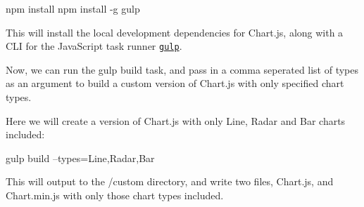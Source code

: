 \begin{DoxyCode}
npm install
npm install -g gulp
\end{DoxyCode}


This will install the local development dependencies for Chart.\+js, along with a C\+LI for the Java\+Script task runner \href{http://gulpjs.com/}{\tt gulp}.

Now, we can run the {\ttfamily gulp build} task, and pass in a comma seperated list of types as an argument to build a custom version of Chart.\+js with only specified chart types.

Here we will create a version of Chart.\+js with only Line, Radar and Bar charts included\+:


\begin{DoxyCode}
gulp build --types=Line,Radar,Bar
\end{DoxyCode}


This will output to the {\ttfamily /custom} directory, and write two files, Chart.\+js, and Chart.\+min.\+js with only those chart types included. 